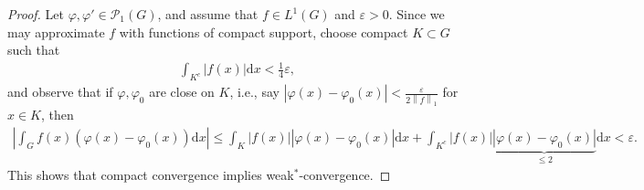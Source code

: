 \documentclass[10pt,twoside,openany,final]{memoir}
\theoremstyle{definition}
\theoremstyle{Break}
\newcommand{\lv}{\left\lVert}
\newcommand{\rv}{\right\rVert}
\renewcommand{\P}{\mathcal{P}}
\renewcommand{\d}{\mathrm{d}}
\begin{document}
\begin{proof}
	Let $\varphi,\varphi' \in \P_1(G)$, and assume that $f \in L^1(G)$ and $\varepsilon>0$. Since we may approximate $f$ with functions of compact support, choose compact $K \subset G$ such that 
	\begin{align*}
		\int_{K^c} |f(x)| \d x < \frac{1}{4}\varepsilon,
	\end{align*}
	and observe that if $\varphi,\varphi_0$ are close on $K$, i.e., say $|\varphi(x)-\varphi_0(x)|< \frac{\varepsilon  }{2\lv f \rv_1}$ for $x \in K$, then
	\begin{align*}
		\left| \int_G f(x)(\varphi(x)-\varphi_0(x)) \d x \right| \leq \int_K |f(x)| | \varphi(x) - \varphi_0(x)| \d x + \int_{K^c}|f(x)| \underbrace{|\varphi(x)-\varphi_0(x)|}_{\leq 2} \d x <\varepsilon.
	\end{align*}
	This shows that compact convergence implies weak$^*$-convergence. 


\end{proof}
\end{document}
